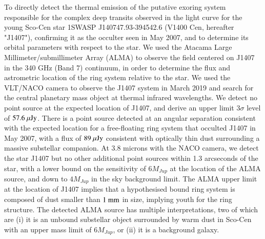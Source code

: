 \documentclass[twocolumn]{aa} %
\begin{document}
   \date{Accepted 2019 November 16}


 
  \abstract
  {} %
  {To directly detect the thermal emission of the putative exoring system responsible for the complex deep transits observed in the light curve for the young Sco-Cen star 1SWASP J140747.93-394542.6 (V1400 Cen, hereafter "J1407"), confirming it as the occulter seen in May 2007, and to determine its orbital parameters with respect to the star.}
  {We used the Atacama Large Millimeter/submillimeter Array (ALMA) to observe the field centered on J1407 in the 340 GHz (Band 7) continuum, in order to determine the flux and astrometric location of the ring system relative to the star.
  We used the VLT/NACO camera to observe the J1407 system in March 2019 and search for the central planetary mass object at thermal infrared wavelengths.}
    {We detect no point source at the expected location of J1407, and derive an upper limit $3\sigma$ level of $57.6~\mu\rm{Jy}$.
      There is a point source detected at an angular separation consistent with the expected location for a free-floating ring system that occulted J1407 in May 2007, with a flux of $89~\mu\rm{Jy}$ consistent with optically thin dust surrounding a massive substellar companion.
      At 3.8 microns with the NACO camera, we detect the star J1407 but no other additional point sources within 1.3 arcseconds of the star, with a lower bound on the sensitivity of $6M_{Jup}$ at the location of the ALMA source, and down to $4M_{Jup}$ in the sky background limit.
      }
   {The ALMA upper limit at the location of J1407 implies that a hypothesised bound ring system is composed of dust smaller than $1\rm{~mm}$ in size, implying youth for the ring structure.
   The detected ALMA source has multiple interpretations, two of which are (i) it is an unbound substellar object surrounded by warm dust in Sco-Cen with an upper mass limit of $6M_{Jup}$, or (ii) it is a background galaxy.
}
\end{document}
